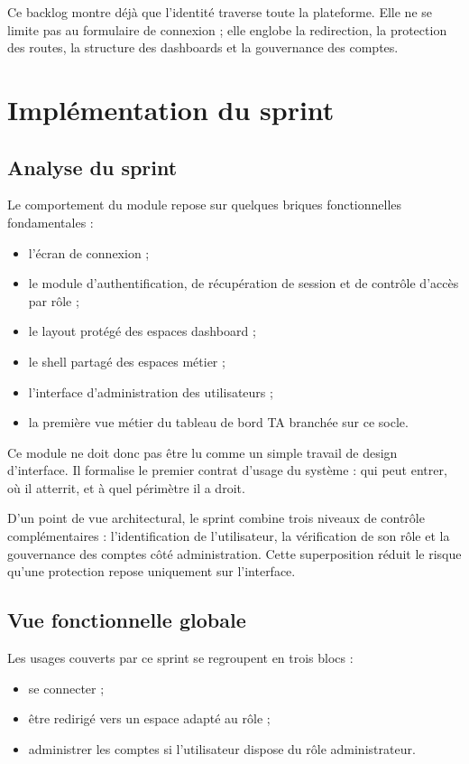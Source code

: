 Ce backlog montre déjà que l'identité traverse toute la plateforme. Elle ne se limite pas au formulaire de connexion ; elle englobe la redirection, la protection des routes, la structure des dashboards et la gouvernance des comptes.

\section{Implémentation du sprint}

\subsection{Analyse du sprint}
Le comportement du module repose sur quelques briques fonctionnelles fondamentales :
\begin{itemize}
  \item l'écran de connexion ;
  \item le module d'authentification, de récupération de session et de contrôle d'accès par rôle ;
  \item le layout protégé des espaces dashboard ;
  \item le shell partagé des espaces métier ;
  \item l'interface d'administration des utilisateurs ;
  \item la première vue métier du tableau de bord TA branchée sur ce socle.
\end{itemize}

Ce module ne doit donc pas être lu comme un simple travail de design d'interface. Il formalise le premier contrat d'usage du système : qui peut entrer, où il atterrit, et à quel périmètre il a droit.

D'un point de vue architectural, le sprint combine trois niveaux de contrôle complémentaires : l'identification de l'utilisateur, la vérification de son rôle et la gouvernance des comptes côté administration. Cette superposition réduit le risque qu'une protection repose uniquement sur l'interface.

\subsection{Vue fonctionnelle globale}
Les usages couverts par ce sprint se regroupent en trois blocs :
\begin{itemize}
  \item se connecter ;
  \item être redirigé vers un espace adapté au rôle ;
  \item administrer les comptes si l'utilisateur dispose du rôle administrateur.
\end{itemize}

